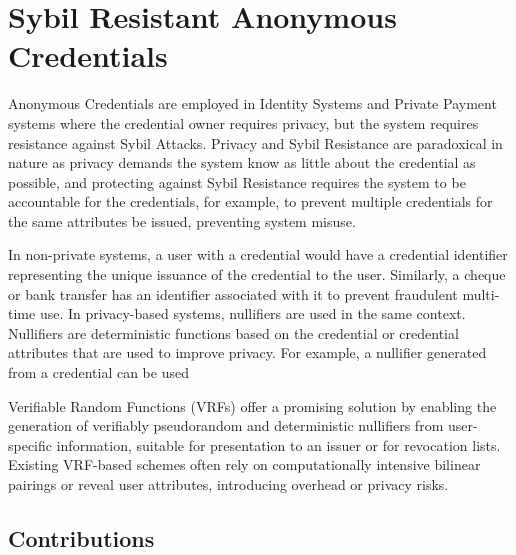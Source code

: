 
\section{Sybil Resistant Anonymous Credentials}
Anonymous Credentials are employed in Identity Systems and Private Payment systems where the credential owner requires privacy, but the system requires resistance against Sybil Attacks. Privacy and Sybil Resistance are paradoxical in nature as privacy demands the system know as little about the credential as possible, and protecting against Sybil Resistance requires the system to be accountable for the credentials, for example, to prevent multiple credentials for the same attributes be issued, preventing system misuse. 

In non-private systems, a user with a credential would have a credential identifier representing the unique issuance of the credential to the user. Similarly, a cheque or bank transfer has an identifier associated with it to prevent fraudulent multi-time use. In privacy-based systems, nullifiers are used in the same context. Nullifiers are deterministic functions based on the credential or credential attributes that are used to improve privacy. For example, a nullifier generated from a credential can be used 

 Verifiable Random Functions (VRFs) offer a promising solution by enabling the generation of verifiably pseudorandom and deterministic nullifiers from user-specific information, suitable for presentation to an issuer or for revocation lists. Existing VRF-based schemes often rely on computationally intensive bilinear pairings or reveal user attributes, introducing overhead or privacy risks.


\subsection{Contributions}

